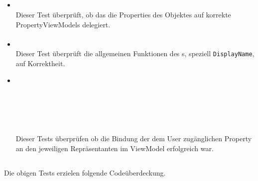 \subsection{}

\paragraph{}

\begin{itemize}

\item{}~\\
Dieser Test überprüft, ob das  die Properties des Objektes auf korrekte PropertyViewModels delegiert.

\end{itemize}

\paragraph{}

\begin{itemize}

	\item {} \\
	Dieser Test überprüft die allgemeinen Funktionen des s, speziell \verb#DisplayName#, auf Korrektheit.
	\item {} \\
	 \\
	 \\
	 \\
	 \\
	 \\
	Dieser Tests überprüfen ob die Bindung der dem User zugänglichen Property an den jeweiligen Repräsentanten im ViewModel erfolgreich war.

\end{itemize}

\subsection{}
Die obigen Tests erzielen folgende Codeüberdeckung.


